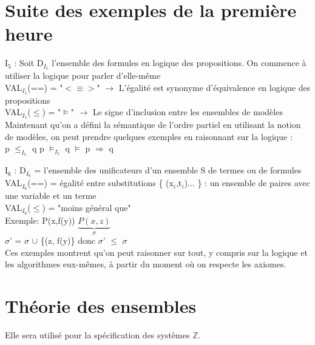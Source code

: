 \section*{Suite des exemples de la première heure}

I$_{5}$ : Soit D$_{I_{5}}$ l'ensemble des formules en logique des propositions. On commence à utiliser la logique pour parler d'elle-même\\
VAL$_{I_{5}}$(==) = "$<\equiv>$" $\rightarrow$ L'égalité est synonyme d'équivalence en logique des propositions\\
VAL$_{I_{5}}$($\leq$) = "$\models$" $\rightarrow$ Le signe d'inclusion entre les ensembles de modèles\\
Maintenant qu'on a défini la sémantique de l'ordre partiel en utilisant la notion de modèles, on peut prendre quelques exemples en raisonnant sur la logique :\\
\newline
p $\leq_{I_{5}}$ q   \hspace{1.5cm} p $\models_{I_{5}}$ q \hspace{1.5cm} $\models$ p $\Rightarrow$ q\\
\newline

I$_{6}$ : D$_{I_{6}}$ = l'ensemble des unificateurs d'un ensemble S de termes ou de formules\\
VAL$_{I_{6}}$(==) = égalité entre substitutions \{ (x$_{i}$,t$_{i}$)... \} : un ensemble de paires avec une variable et un terme\\
VAL$_{I_{6}}$($\leq$) = "moins général que"\\
\newline
Exemple: P(x,f(y)) \hspace{1cm} $\underbrace{P(x,z)}_{\sigma}$\\
$\sigma$' = $\sigma$ $\cup$ \{(z, f(y)\} donc 
$\sigma$' $\leq$ $\sigma$\\

Ces exemples montrent qu'on peut raisonner sur tout, y compris sur la logique et les algorithmes eux-mêmes, à partir du moment où on respecte les axiomes.

\section*{Théorie des ensembles}
Elle sera utilisé pour la spécification des systèmes $\mathbb{Z}$.\\

